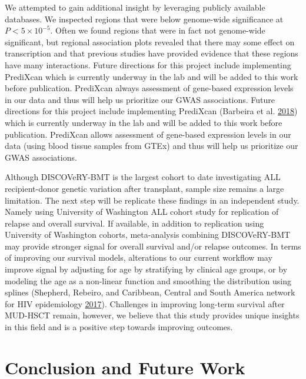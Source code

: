 \documentclass[]{DissertateOSU}
\begin{document}
We attempted to gain additional insight by leveraging publicly available
databases. We inspected regions that were below genome-wide significance
at \(P < 5\times{10}^{-5}\). Often we found regions that were in fact
not genome-wide significant, but regional association plots revealed
that there may some effect on transcription and that previous studies
have provided evidence that these regions have many interactions. Future
directions for this project include implementing PrediXcan which is
currently underway in the lab and will be added to this work before
publication. PrediXcan always assessment of gene-based expression levels
in our data and thus will help us prioritize our GWAS associations.
Future directions for this project include implementing PrediXcan
(Barbeira et al. \protect\hyperlink{ref-Barbeira_2018}{2018}) which is
currently underway in the lab and will be added to this work before
publication. PrediXcan allows assessment of gene-based expression levels
in our data (using blood tissue samples from GTEx) and thus will help us
prioritize our GWAS associations.

Although DISCOVeRY-BMT is the largest cohort to date investigating ALL
recipient-donor genetic variation after transplant, sample size remains
a large limitation. The next step will be replicate these findings in an
independent study. Namely using University of Washington ALL cohort
study for replication of relapse and overall survival. If available, in
addition to replication using University of Washington cohorts,
meta-analysis combining DISCOVeRY-BMT may provide stronger signal for
overall survival and/or relapse outcomes. In terms of improving our
survival models, alterations to our current workflow may improve signal
by adjusting for age by stratifying by clinical age groups, or by
modeling the age as a non-linear function and smoothing the distribution
using splines (Shepherd, Rebeiro, and Caribbean, Central and South
America network for HIV epidemiology
\protect\hyperlink{ref-shepherd_2017}{2017}). Challenges in improving
long-term survival after MUD-HSCT remain, however, we believe that this
study provides unique insights in this field and is a positive step
towards improving outcomes.

\FloatBarrier

\newpage

\pagestyle{plain} \fancyhead[L]{} \fancyhead[R]{}
\fancyfoot[C]{\thepage}

\chapter{Conclusion and Future Work}
\end{document}
